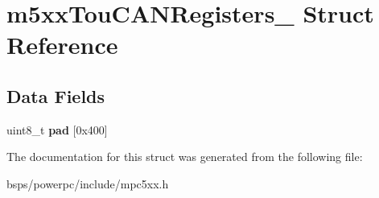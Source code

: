 \hypertarget{structm5xxTouCANRegisters__}{}\section{m5xx\+Tou\+C\+A\+N\+Registers\+\_\+ Struct Reference}
\label{structm5xxTouCANRegisters__}
\subsection*{Data Fields}
\begin{DoxyCompactItemize}
\item 
\mbox{\label{structm5xxTouCANRegisters___a4da499bc2e0d912dcb045b16798d7425}} 
uint8\+\_\+t {\bfseries pad} \mbox{[}0x400\mbox{]}
\end{DoxyCompactItemize}


The documentation for this struct was generated from the following file\+:\begin{DoxyCompactItemize}
\item 
bsps/powerpc/include/mpc5xx.\+h\end{DoxyCompactItemize}
